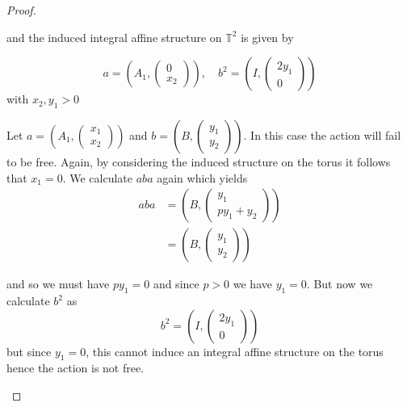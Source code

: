 \begin{proof}
\begin{case}[$A=A_1$, $B=B_1$]
        and the induced integral affine structure on $\mathbb{T}^2$ is given by

        $$
            a = \left(A_1, \begin{pmatrix}
                    0 \\ x_2
                \end{pmatrix} \right), \quad b^2 = \left(I, \begin{pmatrix}
                    2y_1 \\ 0
                \end{pmatrix} \right)
        $$
        with $x_2, y_1 >0$
    \end{case}
    \begin{case}[$A=A_2$, $B=B_1$]
        Let $a = \left( A_1, \begin{pmatrix}
                    x_1 \\ x_2
                \end{pmatrix} \right)$ and $b = \left( B, \begin{pmatrix}
                    y_1 \\ y_2
                \end{pmatrix} \right)$.
        In this case the action will fail to be free. Again, by considering the induced structure on the torus it follows that $x_1=0$. We calculate $aba$ again which yields
        \begin{align*}
            aba & = \left(B, \begin{pmatrix}
                                 y_1 \\ py_1 + y_2
                             \end{pmatrix}\right) \\
                & = \left(B, \begin{pmatrix}
                                 y_1 \\ y_2
                             \end{pmatrix}\right)
        \end{align*}

        and so we must have $py_1 = 0$ and since $p>0$ we have $y_1=0$. But now we
        calculate $b^2$ as $$ b^2 = \left(I, \begin{pmatrix}
                    2y_1 \\ 0
                \end{pmatrix}\right)
        $$
        but since $y_1=0$, this cannot induce an integral affine structure on the torus hence the action is not free.
    \end{case}
\end{proof}
